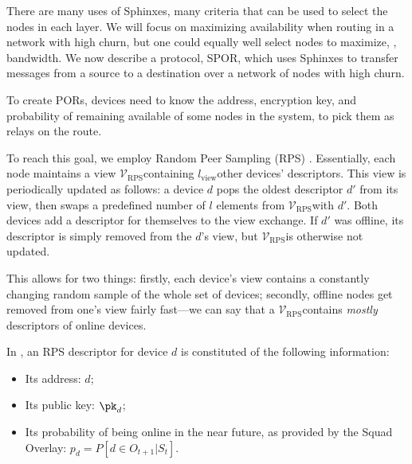 There are many uses of Sphinxes, many criteria that can be used to select the 
nodes in each layer.
We will focus on maximizing availability when routing in a network with high 
churn, but one could equally well select nodes to maximize, \eg, bandwidth.
We now describe a protocol, \ac{SPOR}, which uses Sphinxes to transfer messages 
from a source to a destination over a network of nodes with high churn.


\newcommand{\viewsize}{\ensuremath{l_{\text{view}}\xspace}}
\newcommand{\view}{\ensuremath{\mathcal{V}_{\text{RPS}}\xspace}}
\NewAlgorithm{\GetRandomPeer}{\text{random descriptor from }\view}

To create PORs, devices need to know the address, encryption key, and probability of remaining available of some nodes in the system, to pick them as relays on the route.

To reach this goal, we employ Random Peer Sampling (RPS) \cite{Voulgaris_Gavidia_van_Steen_2005,Jelasity_Voulgaris_Guerraoui_Kermarrec_van_Steen_2007}.
Essentially, each node maintains a view \view containing \viewsize other devices' descriptors. 
This view is periodically updated as follows: a device $d$ pops the oldest descriptor $d'$ from its view, then swaps a predefined number of $l$ elements from \view with $d'$.
Both devices add a descriptor for themselves to the view exchange.
If $d'$ was offline, its descriptor is simply removed from the $d$'s view, but \view is otherwise not updated.

This allows for two things: firstly, each device's view contains a constantly changing random sample of the whole set of devices;
secondly, offline nodes get removed from one's view fairly fast---we can say that a \view contains \emph{mostly} descriptors of online devices.


In \name, an RPS descriptor for device $d$ is constituted of the following information:
\begin{itemize}
  \item Its address: $d$;
  \item Its public key: \(\pk_d\);
  \item Its probability of being online in the near future, as provided by the Squad Overlay: $p_d=P\left[d \in O_{t+1} | S_t\right]$.
\end{itemize}

